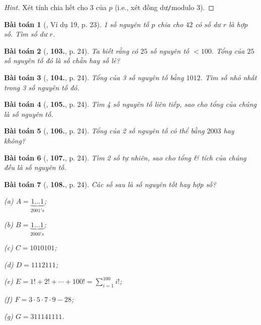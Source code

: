 \documentclass{article}
\numberwithin{equation}{section}
\newtheorem{baitoan}{Bài toán}[section]
\begin{document}
\begin{proof}[Hint]
	Xét tính chia hết cho $3$ của $p$ (i.e., xét đồng dư\texttt{/}modulo $3$).
\end{proof}

\begin{baitoan}[\cite{Binh_Toan_6_tap_1}, Ví dụ 19, p. 23]
	1 số nguyên tố $p$ chia cho $42$ có số dư $r$ là hợp số. Tìm số dư $r$.
\end{baitoan}

\begin{baitoan}[\cite{Binh_Toan_6_tap_1}, \textbf{103.}, p. 24]
	Ta biết rằng có $25$ số nguyên tố $< 100$. Tổng của $25$ số nguyên tố đó là số chẵn hay số lẻ?
\end{baitoan}

\begin{baitoan}[\cite{Binh_Toan_6_tap_1}, \textbf{104.}, p. 24]
	Tổng của 3 số nguyên tố bằng $1012$. Tìm số nhỏ nhất trong 3 số nguyên tố đó.
\end{baitoan}

\begin{baitoan}[\cite{Binh_Toan_6_tap_1}, \textbf{105.}, p. 24]
	Tìm 4 số nguyên tố liên tiếp, sao cho tổng của chúng là số nguyên tố.
\end{baitoan}

\begin{baitoan}[\cite{Binh_Toan_6_tap_1}, \textbf{106.}, p. 24]
	Tổng của 2 số nguyên tố có thể bằng $2003$ hay không?
\end{baitoan}

\begin{baitoan}[\cite{Binh_Toan_6_tap_1}, \textbf{107.}, p. 24]
	Tìm 2 số tự nhiên, sao cho tổng \& tích của chúng đều là số nguyên tố.
\end{baitoan}

\begin{baitoan}[\cite{Binh_Toan_6_tap_1}, \textbf{108.}, p. 24]
	Các số sau là số nguyên tốt hay hợp số?
	\begin{enumerate*}
		\item[(a)] $A = \underbrace{1\ldots 1}_{2001's}$;
		\item[(b)] $B = \underbrace{1\ldots 1}_{2000's}$;
		\item[(c)] $C = 1010101$;
		\item[(d)] $D = 1112111$;
		\item[(e)] $E = 1! + 2! + \cdots + 100! = \sum_{i=1}^{100} i!$;
		\item[(f)] $F = 3\cdot 5\cdot 7\cdot 9 - 28$;
		\item[(g)] $G = 311141111$.
	\end{enumerate*}
\end{baitoan}
\end{document}

